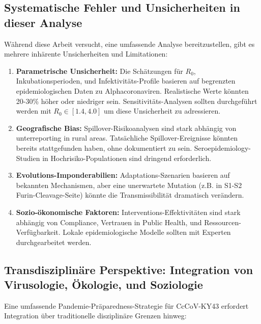 \documentclass[11pt,a4paper]{article}
\theoremstyle{definition}
\begin{document}
\subsection{Systematische Fehler und Unsicherheiten in dieser Analyse}

Während diese Arbeit versucht, eine umfassende Analyse bereitzustellen, gibt es mehrere inhärente Unsicherheiten und Limitationen:

\begin{enumerate}
\item \textbf{Parametrische Unsicherheit:} Die Schätzungen für $R_0$, Inkubationsperioden, und Infektivi\-täts-Profile basieren auf begrenzten epidemiologischen Daten zu Alphacoronaviren. Realistische Werte könnten 20-30\% höher oder niedriger sein. Sensitivitäts-Analysen sollten durchgeführt werden mit $R_0 \in [1.4, 4.0]$ um diese Unsicherheit zu adressieren.

\item \textbf{Geografische Bias:} Spillover-Risikoanalysen sind stark abhängig von unterreporting in rural areas. Tatsächliche Spillover-Ereignisse könnten bereits stattgefunden haben, ohne dokumentiert zu sein. Seroepidemiology-Studien in Hochrisiko-Populationen sind dringend erforderlich.

\item \textbf{Evolutions-Imponderabilien:} Adaptations-Szenarien basieren auf bekannten Mechanismen, aber eine unerwartete Mutation (z.B. in S1-S2 Furin-Cleavage-Seite) könnte die Transmissibilität dramatisch verändern.

\item \textbf{Sozio-ökonomische Faktoren:} Interventions-Effektivitäten sind stark abhängig von Compliance, Vertrauen in Public Health, und Ressourcen-Verfügbarkeit. Lokale epidemiologische Modelle sollten mit Experten durchgearbeitet werden.
\end{enumerate}

\subsection{Transdisziplinäre Perspektive: Integration von Virusologie, Ökologie, und Soziologie}

Eine umfassende Pandemie-Präparedness-Strategie für CcCoV-KY43 erfordert Integration über traditionelle disziplinäre Grenzen hinweg:
\end{document}
